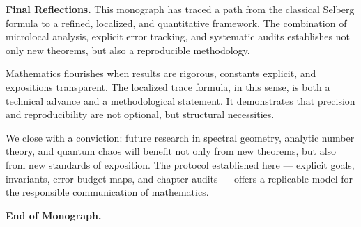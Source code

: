 \medskip

\noindent\textbf{Final Reflections.}
This monograph has traced a path from the classical Selberg formula to a refined, localized, and quantitative framework. The combination of microlocal analysis, explicit error tracking, and systematic audits establishes not only new theorems, but also a reproducible methodology.  

Mathematics flourishes when results are rigorous, constants explicit, and expositions transparent. The localized trace formula, in this sense, is both a technical advance and a methodological statement. It demonstrates that precision and reproducibility are not optional, but structural necessities.  

We close with a conviction: future research in spectral geometry, analytic number theory, and quantum chaos will benefit not only from new theorems, but also from new standards of exposition. The protocol established here --- explicit goals, invariants, error-budget maps, and chapter audits --- offers a replicable model for the responsible communication of mathematics.

\bigskip
\noindent\textbf{End of Monograph.}
